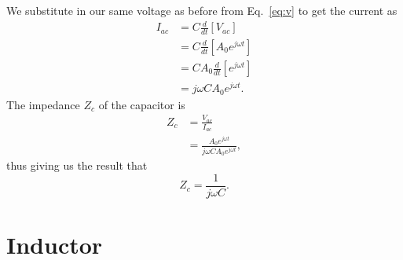 \documentclass{tufte-handout}
\newcommand{\vac}{V_{ac}}%
\newcommand{\iac}{I_{ac}}%
\newcommand{\wt}{\omega{}t}
\begin{document}
We substitute in our same voltage as before from Eq.~\ref{eq:v} to get the current as
\begin{align}
\iac &= C\frac{d}{dt}\left[ \vac \right] \\
 &= C\frac{d}{dt}\left[  A_0e^{j\wt} \right] \\
 &= CA_0\frac{d}{dt}\left[e^{j\wt} \right] \\
&= j\omega CA_0 e^{j\wt}.
\end{align}
The impedance $Z_c$ of the capacitor is
\begin{align}
Z_c &= \frac{\vac}{\iac} \\
&= \frac{A_0e^{j\omega t}}{j\omega CA_0 e^{j\wt}},
\end{align}
thus giving us the result that
\begin{equation}
\boxed{Z_c= \frac{1}{j\omega C}.}
\end{equation}

\section{Inductor}
\end{document}
